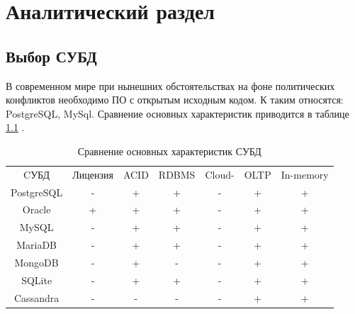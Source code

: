 \chapter{Аналитический раздел}
\section{Выбор СУБД}
В современном мире при нынешних обстоятельствах на фоне политических конфликтов необходимо ПО с открытым исходным кодом. К таким относятся: PostgreSQL, MySql. Сравнение основных характеристик приводится в таблице \ref{table:dbms} \cite{comparative_db}.

\begin{table}[ht!]
	\centering
	\captionsetup{singlelinecheck = false, justification=raggedleft}
	\caption{Сравнение основных характеристик СУБД}
	\label{table:dbms}
	\begin{tabular}{|c|c|c|c|c|c|c|}
		\hline	
		\multirow{2}{*}{CУБД}  & \multirow{2}{*}{Лицензия} & \multirow{2}{*}{ACID}   &\multirow{2}{*}{RDBMS}  & \multirow{2}{*}{Cloud-} & \multirow{2}{*}{OLTP} & \multirow{2}{*}{In-memory} \\
					&		   &	    &	  & only &  &  \\
		\hline
		PostgreSQL  & -  	   & +  	& +   & -  & +  & + \\ \hline
		Oracle  	& +	       & +  	& +   & -  & +  & + \\ \hline
		MySQL	    & -	       & +		& +	  &	-  & +  & + \\ \hline
		MariaDB		& -	       & +		& +	  & -  & +	& + \\ \hline
		MongoDB		& -  	   & +		& -	  & -  & +	& + \\ \hline
		SQLite		& -		   & +		& +	  &	-  & +	& + \\ \hline
		Cassandra	& -		   & -		& -	  &	-  & +	& +  \\ \hline
		\hline
	\end{tabular}
\end{table}

